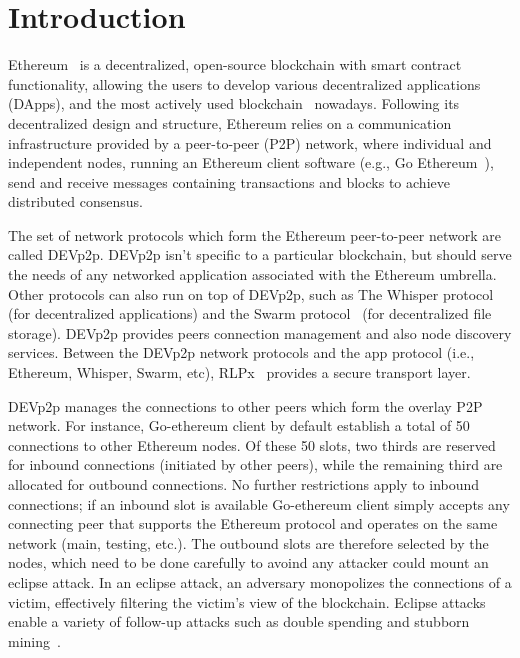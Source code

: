 
\section{Introduction}

Ethereum~\cite{} is a decentralized, open-source blockchain with smart contract functionality, allowing the users to develop various decentralized applications (DApps),  and the most actively used blockchain~\cite{bloomberg} nowadays.
Following its decentralized design and structure, Ethereum relies on a communication infrastructure provided by a peer-to-peer (P2P) network, where individual and independent nodes, running an Ethereum client software (e.g., Go Ethereum~\cite{go-ethereum}), send and receive messages  containing transactions and blocks to achieve distributed consensus.

The set of network protocols which form the Ethereum peer-to-peer network are called DEVp2p. DEVp2p isn't specific to a particular blockchain, but should serve the needs of any networked application associated with the Ethereum umbrella.
Other protocols can also run on top of DEVp2p, such as 
The Whisper protocol~\cite{} (for decentralized
applications) and the Swarm protocol~\cite{} (for decentralized file
storage).
DEVp2p provides peers connection management and also node discovery services.
Between the DEVp2p network protocols and the app protocol (i.e., Ethereum, Whisper, Swarm, etc), RLPx~\cite{} provides a secure transport layer. 

DEVp2p manages the connections to other peers which form the overlay P2P network.
For instance,  Go-ethereum client by default establish a total of 50  connections to other Ethereum nodes.  Of these 50 slots,  two thirds are reserved for inbound connections (initiated by other peers),  while the remaining third are allocated for outbound connections. 
No further restrictions apply to inbound connections; if an inbound slot is available
Go-ethereum client simply accepts any connecting peer that supports the
Ethereum protocol and operates on the same network (main,
testing, etc.). 
The outbound slots are therefore selected by the nodes, which need to be done carefully to avoind any attacker could mount an eclipse attack.
In an eclipse attack, an
adversary monopolizes the connections of a victim, effectively
filtering the victim’s view of the blockchain.  Eclipse attacks
enable a variety of follow-up attacks such as double spending
and stubborn mining~\cite{}.

